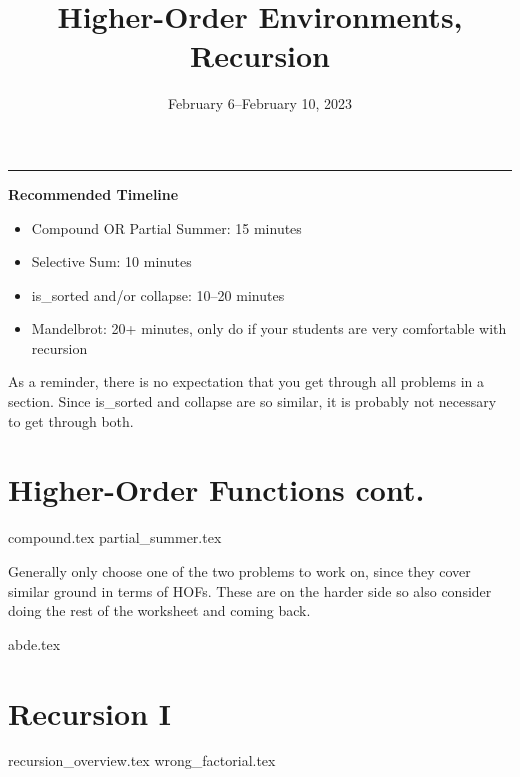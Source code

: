 \documentclass{exam}
\title{Higher-Order Environments, Recursion}
\date{February 6--February 10, 2023}
\begin{document}
\maketitle
\rule{\textwidth}{0.15em}
\fontsize{12}{15}\selectfont

\begin{meta}
\textbf{Recommended Timeline}
\begin{itemize}
    \item Compound OR Partial Summer: 15 minutes
    \item Selective Sum: 10 minutes
    \item is\_sorted and/or collapse: 10--20 minutes
    \item Mandelbrot: 20+ minutes, only do if your students are very comfortable with recursion
\end{itemize}
As a reminder, there is no expectation that you get through all problems in a section. Since is\_sorted and collapse are so similar, it is probably not necessary to get through both. 
\end{meta}

\begin{questions}
    \section{Higher-Order Functions cont.}
    {compound.tex}
    {partial_summer.tex}
    \begin{questionmeta}
        Generally only choose one of the two problems to work on, since they cover similar ground in terms of HOFs. These are on the harder side so also consider doing the rest of the worksheet and coming back.
    \end{questionmeta}

    {abde.tex}

    \section{Recursion I}
    {recursion_overview.tex}
    {wrong_factorial.tex}
\end{questions}
\end{document}

